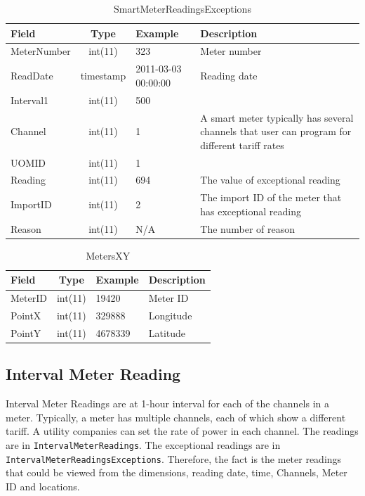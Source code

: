 \documentclass[a4paper,12pt]{llncs}
\begin{document}
\begin{table}[htp]
\centering
\caption{SmartMeterReadingsExceptions}
\begin{tabular}{|l|c|l|p{8.5cm}|}
 \hline
 {\bf Field}       & {\bf Type} & {\bf Example}     & {\bf Description } \\ \hline
MeterNumber&int(11)  &323 & Meter number  \\ \hline
ReadDate   &timestamp&2011-03-03 00:00:00 & Reading date  \\ \hline
Interval1  &int(11)  &500 &   \\ \hline
Channel    &int(11)  &1 &  A smart meter typically has several channels that user can program for different tariff rates \\ \hline
UOMID      &int(11)  &1 &   \\ \hline
Reading    &int(11)  &694 &  The value of exceptional reading \\ \hline
ImportID   &int(11)  &2 &  The import ID of the meter that has exceptional reading \\ \hline
Reason     &int(11)  &N/A & The number of reason  \\ \hline
\end{tabular}
\end{table}
\begin{table}[htp]
\centering
\caption{MetersXY}
\begin{tabular}{|l|c|l|p{11.2cm}|}
 \hline
 {\bf Field}       & {\bf Type} & {\bf Example}     & {\bf Description } \\ \hline
MeterID&int(11)&19420 &  Meter ID \\ \hline
PointX &int(11)&329888 & Longitude  \\ \hline
PointY &int(11)&4678339 &  Latitude \\ \hline
\end{tabular}
\end{table}

\newpage
\subsection{Interval Meter Reading}
Interval Meter Readings are  at 1-hour interval for each of the channels in a meter. Typically, a meter has multiple channels, each of which show a different tariff. A utility companies can set the rate of power in each channel. The readings are in \texttt{IntervalMeterReadings}. The exceptional readings are in \texttt{IntervalMeterReadings\-Exceptions}. Therefore, the fact is the meter readings that could be viewed from the dimensions, reading date, time, Channels, Meter ID and locations.
\end{document}
